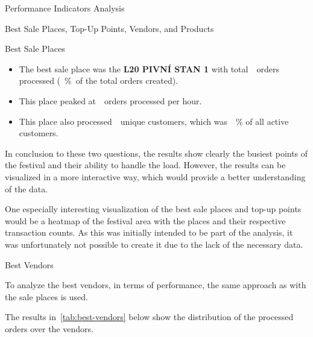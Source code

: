 \begin{section}{Performance Indicators Analysis}
\begin{subsection}{Best Sale Places, Top-Up Points, Vendors, and Products}
\begin{subsubsection}{Best Sale Places}
			\begin{keytakeaways}
				\begin{itemize}
					\item The best sale place was the \textbf{L20 PIVNÍ STAN 1} with total~~orders processed (~\%~of the total orders created).
					\item This place peaked at~~orders processed per hour.
					\item This place also processed~~unique customers, which was~~\% of all active customers.
				\end{itemize}
			\end{keytakeaways}

			In conclusion to these two questions, the results show clearly the busiest points of the festival and their ability to handle the load.
			However, the results can be visualized in a more interactive way, which would provide a better understanding of the data.

			One especially interesting visualization of the best sale places and top-up points would be a heatmap of the festival area with the places and their respective transaction counts.
			As this was initially intended to be part of the analysis, it was unfortunately not possible to create it due to the lack of the necessary data.
		\end{subsubsection}

		\begin{subsubsection}{Best Vendors}
			\label{subsubsec:analysis-best-vendors}

			To analyze the best vendors, in terms of performance, the same approach as with the sale places is used.


			The results in~\autoref{tab:best-vendors} below show the distribution of the processed orders over the vendors.


\end{subsubsection}
\end{subsection}
\end{section}
